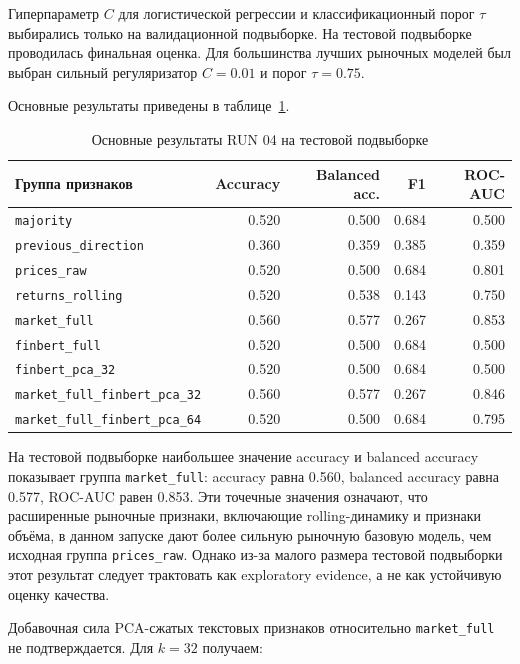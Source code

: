 Гиперпараметр $C$ для логистической регрессии и классификационный порог $\tau$ выбирались только на валидационной подвыборке. На тестовой подвыборке проводилась финальная оценка. Для большинства лучших рыночных моделей был выбран сильный регуляризатор $C=0.01$ и порог $\tau=0.75$.

Основные результаты приведены в таблице~\ref{tab:run04_results}.

\begin{table}[htbp]
\centering
\begin{tabular}{lrrrr}
\toprule
Группа признаков & Accuracy & Balanced acc. & F1 & ROC-AUC \\
\midrule
\texttt{majority} & 0.520 & 0.500 & 0.684 & 0.500 \\
\texttt{previous\_direction} & 0.360 & 0.359 & 0.385 & 0.359 \\
\texttt{prices\_raw} & 0.520 & 0.500 & 0.684 & 0.801 \\
\texttt{returns\_rolling} & 0.520 & 0.538 & 0.143 & 0.750 \\
\texttt{market\_full} & 0.560 & 0.577 & 0.267 & 0.853 \\
\texttt{finbert\_full} & 0.520 & 0.500 & 0.684 & 0.500 \\
\texttt{finbert\_pca\_32} & 0.520 & 0.500 & 0.684 & 0.500 \\
\texttt{market\_full\_finbert\_pca\_32} & 0.560 & 0.577 & 0.267 & 0.846 \\
\texttt{market\_full\_finbert\_pca\_64} & 0.520 & 0.500 & 0.684 & 0.795 \\
\bottomrule
\end{tabular}
\caption{Основные результаты RUN 04 на тестовой подвыборке}
\label{tab:run04_results}
\end{table}

На тестовой подвыборке наибольшее значение accuracy и balanced accuracy показывает группа \texttt{market\_full}: accuracy равна 0.560, balanced accuracy равна 0.577, ROC-AUC равен 0.853. Эти точечные значения означают, что расширенные рыночные признаки, включающие rolling-динамику и признаки объёма, в данном запуске дают более сильную рыночную базовую модель, чем исходная группа \texttt{prices\_raw}. Однако из-за малого размера тестовой подвыборки этот результат следует трактовать как exploratory evidence, а не как устойчивую оценку качества.

Добавочная сила PCA-сжатых текстовых признаков относительно \texttt{market\_full} не подтверждается. Для $k=32$ получаем:

